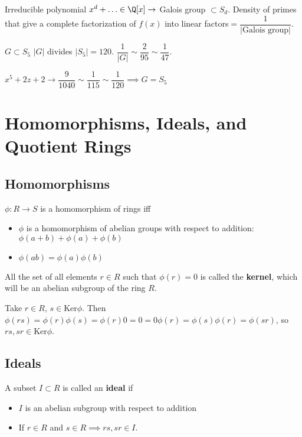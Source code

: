 \documentclass[twoside, 10pt]{article}
\newcommand{\Ker}{\text{Ker}}
\begin{document}
Irreducible polynomial $x^d + \ldots \in \Q[x] \to $ Galois group $\subset S_d$. Density of primes that give a complete factorization of $f(x)$ into linear factors$ = \dfrac{1}{|\text{Galois group}|}$.

$G\subset S_5$ $|G|$ divides $|S_5| = 120$. $\dfrac{1}{|G|} \sim \dfrac{2}{95}\sim \dfrac{1}{47}$.

$x^5 + 2z + 2 \to \dfrac{9}{1040} \sim \dfrac{1}{115} \sim \dfrac{1}{120}\implies G = S_5$

\section{Homomorphisms, Ideals, and Quotient Rings}
\subsection{Homomorphisms}
\begin{defn}
    $\phi: R \to S$ is a homomorphism of rings iff \begin{itemize}
        \item $\phi$ is a homomorphism of abelian groups with respect to addition: $\phi(a + b) + \phi(a) + \phi(b)$
        \item $\phi(ab) = \phi(a)\phi(b)$
    \end{itemize}
\end{defn}

\begin{defn}
    All the set of all elements $r\in R$ such that $\phi(r) = 0$ is called the \textbf{kernel}, which will be an abelian subgroup of the ring $R$.
\end{defn}

Take $r\in R$, $s\in \Ker\phi$. Then $\phi(rs) = \phi(r)\phi(s) = \phi(r)0 = 0 = 0\phi(r) = \phi(s)\phi(r) = \phi(sr)$, so $rs, sr \in \Ker\phi$.

\subsection{Ideals}
\begin{defn}
    A subset $I \subset R$ is called an \textbf{ideal} if \begin{itemize}
        \item $I$ is an abelian subgroup with respect to addition
        \item If $r\in R$ and $s\in R \implies rs, sr \in I$.
    \end{itemize}
\end{defn}
\end{document}
